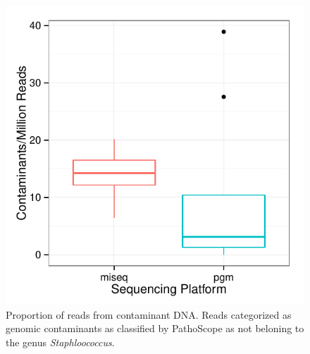 \documentclass[smallextended]{svjour3}\usepackage[]{graphicx}\usepackage[]{color}
\makeatletter
\def\maxwidth{ %
  \ifdim\Gin@nat@width>\linewidth
    \linewidth
  \else
    \Gin@nat@width
  \fi
}
\newenvironment{knitrout}{}{} %
\makeatother
\begin{document}
\begin{knitrout}
\color{fgcolor}\begin{figure}

{\centering \includegraphics[width=\maxwidth]{figure/contamCountsFig-1} 

}

\caption[Proportion of reads from contaminant DNA]{Proportion of reads from contaminant DNA. Reads categorized as genomic contaminants as classified by PathoScope as not beloning to the genus \textit{Staphloococcus}.}\label{fig:contamCountsFig}
\end{figure}


\end{knitrout}
\end{document}
